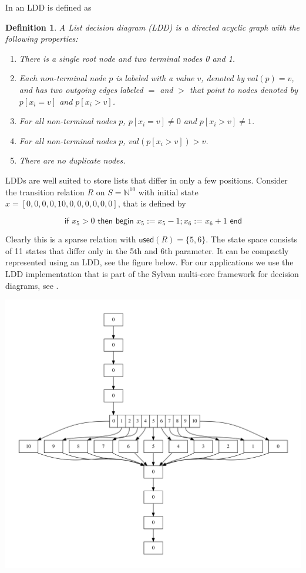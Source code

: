\documentclass[a4paper]{article}
\newtheorem{definition}[theorem]{Definition}
\begin{document}
\noindent
In \cite{MeijerBlomPol2008} an LDD is defined as

\begin{definition}
A List decision diagram (LDD) is a
directed acyclic graph with the following properties:
\begin{enumerate}
    \item There is a single root node and two terminal nodes 0 and 1.
    \item Each non-terminal node $p$ is labeled with a value $v$, denoted by $val(p) = v$,
and has two outgoing edges labeled $=$ and $>$ that point to nodes denoted by
$p[x_i = v]$ and $p[x_i > v]$.
    \item For all non-terminal nodes $p$, $p[x_i = v] \neq 0$ and $p[x_i > v] \neq 1$.
    \item For all non-terminal nodes $p$, $val(p[x_i > v]) > v$.
    \item There are no duplicate nodes.
 \end{enumerate}
\end{definition}

\noindent
LDDs are well suited to store lists that differ in only a few positions.
Consider the transition relation $R$ on $S = \mathbb{N}^{10}$ with initial state
$x = [0, 0, 0, 0, 10, 0, 0, 0, 0, 0, 0]$, that is defined by

\[
\textsf{if } x_5 > 0 \textsf{ then begin } x_5 := x_5 - 1; x_6 := x_6 + 1 \textsf{ end}
\]

Clearly this is a sparse relation with $\textsf{used}(R) = \{ 5, 6 \}$. The state space
consists of 11 states that differ only in the 5th and 6th parameter. It can be compactly
represented using an LDD, see the figure below. For our applications we use the LDD implementation that is part of the Sylvan multi-core framework for decision diagrams, see
\cite{DBLP:journals/sttt/DijkP17}.

\includegraphics[width=15cm]{ldd_if_then.pdf}
\end{document}
